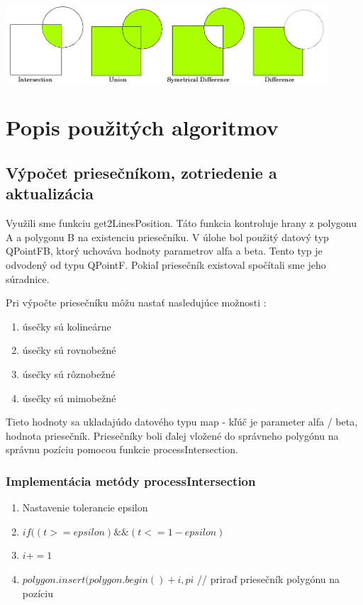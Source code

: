 \documentclass[12pt]{article}
\begin{document}
\begin{center}
   \includegraphics[width=12cm]{./img/operac.png}
\end{center}
\clearpage 
\section {Popis použitých algoritmov}
\subsection {Výpočet priesečníkom, zotriedenie a aktualizácia}
Využili sme funkciu get2LinesPosition. Táto funkcia kontroluje hrany z polygonu A a polygonu B na existenciu priesečníku. V úlohe bol použitý datový typ QPointFB, ktorý uchováva hodnoty parametrov alfa a beta. Tento typ je odvodený od typu QPointF.  Pokiaľ priesečník existoval spočítali sme jeho súradnice. 

Pri výpočte priesečníku môžu nastať nasledujúce možnosti :
\begin{enumerate}
\item úsečky sú kolineárne
\item úsečky sú rovnobežné
\item úsečky sú rôznobežné
\item úsečky sú mimobežné
\end{enumerate}

Tieto hodnoty sa ukladajúdo datového typu map - kľúč je parameter alfa / beta,  hodnota priesečník. Priesečníky boli ďalej vložené do správneho polygónu na správnu pozíciu pomocou funkcie processIntersection.

\subsubsection {Implementácia metódy processIntersection}
\begin{enumerate}
\item Nastavenie tolerancie epsilon
\item $ if ((t >= epsilon ) \&\& (t <= 1- epsilon ) $
\item $ i += 1$
\item $polygon.insert(polygon.begin() + i,pi $ // priraď priesečník polygónu na pozíciu
\end{enumerate}
\end{document}
